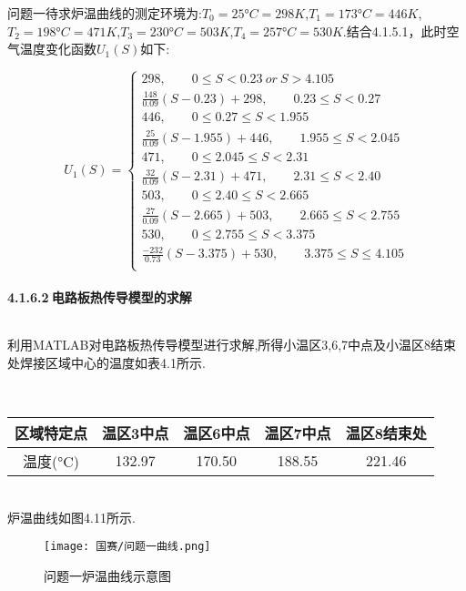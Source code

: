 \documentclass[12pt]{ctexart}
\numberwithin{figure}{section}
\numberwithin{table}{section}
\begin{document}
问题一待求炉温曲线的测定环境为:$T_0=25°C=298K$,$T_1=173°C=446K$,$T_2=198°C=471K$,$T_3=230°C=503K$,$T_4=257°C=530K$.结合4.1.5.1，此时空气温度变化函数$U_1(S)$如下:

\begin{equation}
U_1(S)=\left\{
\begin{array}{cc}
298,\quad\quad0\leq S<0.23\ or\ S>4.105\\
\frac{148}{0.09}(S-0.23)+298,\quad\quad0.23\leq S<0.27\\
446,\quad\quad0\leq 0.27\leq S<1.955\\
\frac{25}{0.09}(S-1.955)+446,\quad\quad1.955\leq S<2.045\\
471,\quad\quad0\leq 2.045\leq S<2.31\\
\frac{32}{0.09}(S-2.31)+471,\quad\quad 2.31\leq S<2.40\\
503,\quad\quad0\leq 2.40\leq S<2.665\\
\frac{27}{0.09}(S-2.665)+503,\quad\quad2.665\leq S<2.755\\
530,\quad\quad0\leq 2.755\leq S<3.375\\
\frac{-232}{0.73}(S-3.375)+530,\quad\quad3.375\leq S\leq4.105\\
\end{array}\right. 
\end{equation}

\paragraph{4.1.6.2$\ $电路板热传导模型的求解}$\ $

利用MATLAB对电路板热传导模型进行求解,所得小温区3,6,7中点及小温区8结束处焊接区域中心的温度如表4.1所示.
\begin{longtable}
\centering
\setlength{\abovecaptionskip}{0pt}
\caption{区域特定点温度数据表}
\label{}\\
\begin{tabular}{c|c|c|c|c}
\hline
区域特定点&温区3中点&温区6中点&温区7中点&温区8结束处\\
\hline
温度(°C)&132.97&170.50&188.55&221.46\\
\hline
    \end{tabular}
    \end{longtable}\\
    
炉温曲线如图4.11所示.
\begin{figure}[!htp]
    \centering
    \setlength{\belowcaptionskip}{0pt}
    \texttt{[image: 国赛/问题一曲线.png]}
    \caption{问题一炉温曲线示意图}
    \label{tab:图1}
\end{figure}
\newpage
\end{document}

